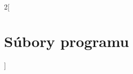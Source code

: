 \documentclass[main.tex]{subfiles}
\begin{document}
	\begin{multicols*}{2}[
		\section{Súbory programu}]
		
	\end{multicols*}
\end{document}
